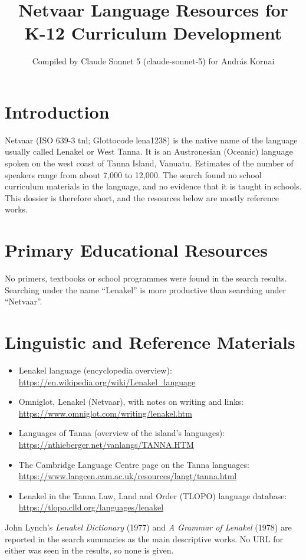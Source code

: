 \documentclass[12pt]{article}
\title{Netvaar Language Resources for K-12 Curriculum Development}
\author{Compiled by Claude Sonnet 5 (claude-sonnet-5) for Andr\'as Kornai}
\date{}
\begin{document}
\maketitle

\section{Introduction}
Netvaar (ISO 639-3 tnl; Glottocode lena1238) is the native name of the language usually called Lenakel or West Tanna. It is an Austronesian (Oceanic) language spoken on the west coast of Tanna Island, Vanuatu. Estimates of the number of speakers range from about 7,000 to 12,000. The search found no school curriculum materials in the language, and no evidence that it is taught in schools. This dossier is therefore short, and the resources below are mostly reference works.

\section{Primary Educational Resources}
No primers, textbooks or school programmes were found in the search results. Searching under the name ``Lenakel'' is more productive than searching under ``Netvaar''.

\section{Linguistic and Reference Materials}
\begin{itemize}
\item Lenakel language (encyclopedia overview): \url{https://en.wikipedia.org/wiki/Lenakel_language}
\item Omniglot, Lenakel (Netvaar), with notes on writing and links: \url{https://www.omniglot.com/writing/lenakel.htm}
\item Languages of Tanna (overview of the island's languages): \url{https://nthieberger.net/vanlangs/TANNA.HTM}
\item The Cambridge Language Centre page on the Tanna languages: \url{https://www.langcen.cam.ac.uk/resources/langt/tanna.html}
\item Lenakel in the Tanna Law, Land and Order (TLOPO) language database: \url{https://tlopo.clld.org/languages/lenakel}
\end{itemize}
John Lynch's \emph{Lenakel Dictionary} (1977) and \emph{A Grammar of Lenakel} (1978) are reported in the search summaries as the main descriptive works. No URL for either was seen in the results, so none is given.
\end{document}
